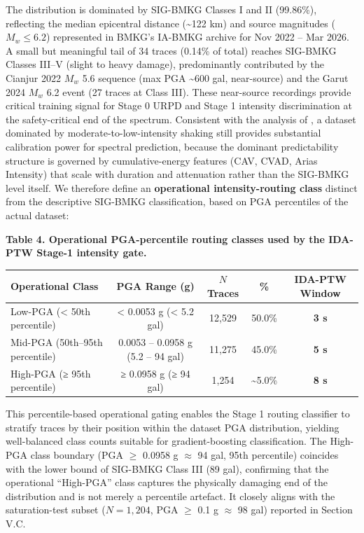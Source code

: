 \documentclass[10pt]{article}
\begin{document}
The distribution is dominated by SIG-BMKG Classes I and II (99.86\%), reflecting the median epicentral distance (\textasciitilde122 km) and source magnitudes (\(M_w \leq 6.2\)) represented in BMKG's IA-BMKG archive for Nov 2022 -- Mar 2026. A small but meaningful tail of 34 traces (0.14\% of total) reaches SIG-BMKG Classes III--V (slight to heavy damage), predominantly contributed by the Cianjur 2022 \(M_w\) 5.6 sequence (max PGA \textasciitilde600 gal, near-source) and the Garut 2024 \(M_w\) 6.2 event (27 traces at Class III). These near-source recordings provide critical training signal for Stage 0 URPD and Stage 1 intensity discrimination at the safety-critical end of the spectrum. Consistent with the analysis of \citet{ref19}, a dataset dominated by moderate-to-low-intensity shaking still provides substantial calibration power for spectral prediction, because the dominant predictability structure is governed by cumulative-energy features (CAV, CVAD, Arias Intensity) that scale with duration and attenuation rather than the SIG-BMKG level itself. We therefore define an \textbf{operational intensity-routing class} distinct from the descriptive SIG-BMKG classification, based on PGA percentiles of the actual dataset:

\par\vspace{16pt}\noindent\begingroup\centering\fontsize{8}{10}\selectfont\textbf{Table 4. Operational PGA-percentile routing classes used by the IDA-PTW Stage-1 intensity gate.}\par\endgroup\vspace{6pt}

\begin{longtable}[]{@{}lcccc@{}}
\toprule
Operational Class & PGA Range (g) & \(N\) Traces & \% & IDA-PTW Window\tabularnewline
\midrule
\endhead
Low-PGA (\textless{} 50th percentile) & \textless{} 0.0053 g (\textless{} 5.2 gal) & 12,529 & 50.0\% & \textbf{3 s}\tabularnewline
Mid-PGA (50th--95th percentile) & 0.0053 -- 0.0958 g (5.2 -- 94 gal) & 11,275 & 45.0\% & \textbf{5 s}\tabularnewline
High-PGA (≥ 95th percentile) & ≥ 0.0958 g (≥ 94 gal) & 1,254 & \textasciitilde5.0\% & \textbf{8 s}\tabularnewline
\bottomrule
\end{longtable}

This percentile-based operational gating enables the Stage 1 routing classifier to stratify traces by their position within the dataset PGA distribution, yielding well-balanced class counts suitable for gradient-boosting classification. The High-PGA class boundary (PGA \(\geq\) 0.0958 g \(\approx\) 94 gal, 95th percentile) coincides with the lower bound of SIG-BMKG Class III (89 gal), confirming that the operational ``High-PGA'' class captures the physically damaging end of the distribution and is not merely a percentile artefact. It closely aligns with the saturation-test subset (\(N = 1,204\), PGA \(\geq\) 0.1 g \(\approx\) 98 gal) reported in Section V.C.
\end{document}

